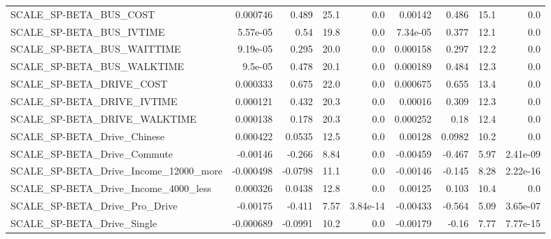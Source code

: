 \begin{tabular}{lrrrrrrrr}
SCALE\_SP-BETA\_BUS\_COST                             &    0.000746 &        0.489 &      25.1 &      0.0 &    0.00142 &       0.486 &         15.1 &           0.0 \\
SCALE\_SP-BETA\_BUS\_IVTIME                           &    5.57e-05 &         0.54 &      19.8 &      0.0 &   7.34e-05 &       0.377 &         12.1 &           0.0 \\
SCALE\_SP-BETA\_BUS\_WAITTIME                         &    9.19e-05 &        0.295 &      20.0 &      0.0 &   0.000158 &       0.297 &         12.2 &           0.0 \\
SCALE\_SP-BETA\_BUS\_WALKTIME                         &     9.5e-05 &        0.478 &      20.1 &      0.0 &   0.000189 &       0.484 &         12.3 &           0.0 \\
SCALE\_SP-BETA\_DRIVE\_COST                           &    0.000333 &        0.675 &      22.0 &      0.0 &   0.000675 &       0.655 &         13.4 &           0.0 \\
SCALE\_SP-BETA\_DRIVE\_IVTIME                         &    0.000121 &        0.432 &      20.3 &      0.0 &    0.00016 &       0.309 &         12.3 &           0.0 \\
SCALE\_SP-BETA\_DRIVE\_WALKTIME                       &    0.000138 &        0.178 &      20.3 &      0.0 &   0.000252 &        0.18 &         12.4 &           0.0 \\
SCALE\_SP-BETA\_Drive\_Chinese                        &    0.000422 &       0.0535 &      12.5 &      0.0 &    0.00128 &      0.0982 &         10.2 &           0.0 \\
SCALE\_SP-BETA\_Drive\_Commute                        &    -0.00146 &       -0.266 &      8.84 &      0.0 &   -0.00459 &      -0.467 &         5.97 &      2.41e-09 \\
SCALE\_SP-BETA\_Drive\_Income\_12000\_more              &   -0.000498 &      -0.0798 &      11.1 &      0.0 &   -0.00146 &      -0.145 &         8.28 &      2.22e-16 \\
SCALE\_SP-BETA\_Drive\_Income\_4000\_less               &    0.000326 &       0.0438 &      12.8 &      0.0 &    0.00125 &       0.103 &         10.4 &           0.0 \\
SCALE\_SP-BETA\_Drive\_Pro\_Drive                      &    -0.00175 &       -0.411 &      7.57 & 3.84e-14 &   -0.00433 &      -0.564 &         5.09 &      3.65e-07 \\
SCALE\_SP-BETA\_Drive\_Single                         &   -0.000689 &      -0.0991 &      10.2 &      0.0 &   -0.00179 &       -0.16 &         7.77 &      7.77e-15 \\

\end{tabular}
